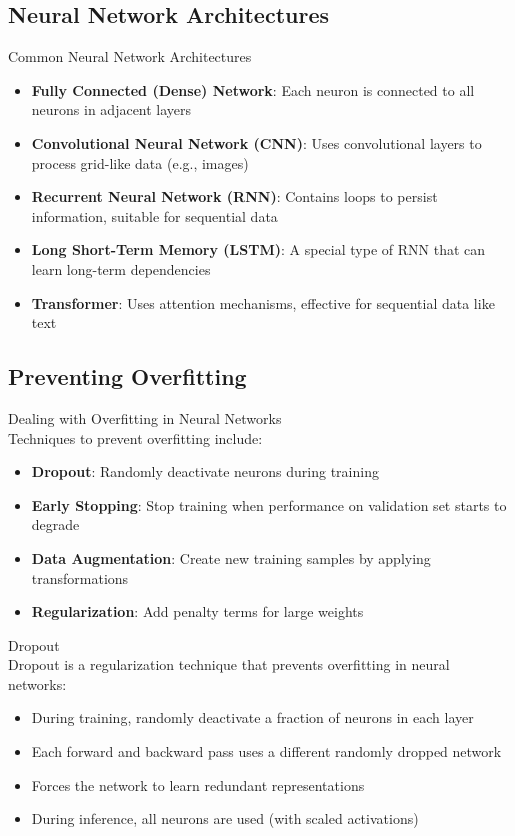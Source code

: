 \subsection{Neural Network Architectures}

\begin{definition}{Common Neural Network Architectures}\\
\begin{itemize}
    \item \textbf{Fully Connected (Dense) Network}: Each neuron is connected to all neurons in adjacent layers
    \item \textbf{Convolutional Neural Network (CNN)}: Uses convolutional layers to process grid-like data (e.g., images)
    \item \textbf{Recurrent Neural Network (RNN)}: Contains loops to persist information, suitable for sequential data
    \item \textbf{Long Short-Term Memory (LSTM)}: A special type of RNN that can learn long-term dependencies
    \item \textbf{Transformer}: Uses attention mechanisms, effective for sequential data like text
\end{itemize}
\end{definition}

\subsection{Preventing Overfitting}

\begin{concept}{Dealing with Overfitting in Neural Networks}\\
Techniques to prevent overfitting include:
\begin{itemize}
    \item \textbf{Dropout}: Randomly deactivate neurons during training
    \item \textbf{Early Stopping}: Stop training when performance on validation set starts to degrade
    \item \textbf{Data Augmentation}: Create new training samples by applying transformations
    \item \textbf{Regularization}: Add penalty terms for large weights
\end{itemize}
\end{concept}

\begin{definition}{Dropout}\\
Dropout is a regularization technique that prevents overfitting in neural networks:
\begin{itemize}
    \item During training, randomly deactivate a fraction of neurons in each layer
    \item Each forward and backward pass uses a different randomly dropped network
    \item Forces the network to learn redundant representations
    \item During inference, all neurons are used (with scaled activations)
\end{itemize}
\end{definition}

